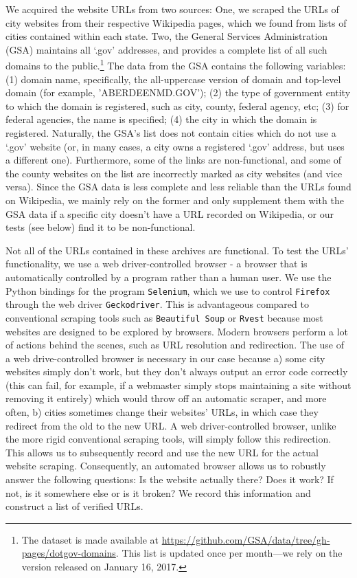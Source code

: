 \documentclass[11pt]{article}
\begin{document}
We acquired the website URLs from two sources: One, we scraped the URLs of city websites from their respective Wikipedia pages, which we found from lists of cities contained within each state. Two, the General Services Administration (GSA) maintains all `.gov' addresses, and provides a complete list of all such domains to the public.\footnote{The dataset is made available at \url{https://github.com/GSA/data/tree/gh-pages/dotgov-domains}. This list is updated once per month---we rely on the version released on January 16, 2017.} The data from the GSA contains the following variables: (1) domain name, specifically, the all-uppercase version of domain and top-level domain (for example, 'ABERDEENMD.GOV'); (2) the type of government entity to which the domain is registered, such as city, county, federal agency, etc; (3) for federal agencies, the name is specified; (4) the city in which the domain is registered. Naturally, the GSA's list does not contain cities which do not use a `.gov' website (or, in many cases, a city owns a registered `.gov' address, but uses a different one). Furthermore, some of the links are non-functional, and some of the county websites on the list are incorrectly marked as city websites (and vice versa). Since the GSA data is less complete and less reliable than the URLs found on Wikipedia, we mainly rely on the former and only supplement them with the GSA data if a specific city doesn't have a URL recorded on Wikipedia, or our tests (see below) find it to be non-functional.

Not all of the URLs contained in these archives are functional. To test the URLs' functionality, we use a web driver-controlled browser - a browser that is automatically controlled by a program rather than a human user. We use the Python bindings for the program \texttt{Selenium}, which we use to control \texttt{Firefox} through the web driver  \texttt{Geckodriver}. This is advantageous compared to conventional scraping tools such as \texttt{Beautiful Soup} or \texttt{Rvest} because most websites are designed to be explored by browsers. Modern browsers perform a lot of actions behind the scenes, such as URL resolution and redirection. The use of a web drive-controlled browser is necessary in our case because a) some city websites simply don't work, but they don't always output an error code correctly (this can fail, for example, if a webmaster simply stops maintaining a site without removing it entirely) which would throw off an automatic scraper, and more often, b) cities sometimes change their websites' URLs, in which case they redirect from the old to the new URL. A web driver-controlled browser, unlike the more rigid conventional scraping tools, will simply follow this redirection. This allows us to subsequently record and use the new URL for the actual website scraping. Consequently, an automated browser allows us to robustly answer the following questions: Is the website actually there? Does it work? If not, is it somewhere else or is it broken? We record this information and construct a list of verified URLs.
\end{document}
